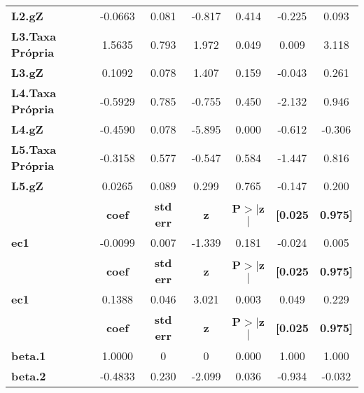 \begin{center}
\begin{tabular}{lcccccc}
\textbf{L2.gZ}           &      -0.0663  &        0.081     &    -0.817  &         0.414        &       -0.225    &        0.093     \\
\textbf{L3.Taxa Própria} &       1.5635  &        0.793     &     1.972  &         0.049        &        0.009    &        3.118     \\
\textbf{L3.gZ}           &       0.1092  &        0.078     &     1.407  &         0.159        &       -0.043    &        0.261     \\
\textbf{L4.Taxa Própria} &      -0.5929  &        0.785     &    -0.755  &         0.450        &       -2.132    &        0.946     \\
\textbf{L4.gZ}           &      -0.4590  &        0.078     &    -5.895  &         0.000        &       -0.612    &       -0.306     \\
\textbf{L5.Taxa Própria} &      -0.3158  &        0.577     &    -0.547  &         0.584        &       -1.447    &        0.816     \\
\textbf{L5.gZ}           &       0.0265  &        0.089     &     0.299  &         0.765        &       -0.147    &        0.200     \\
             & \textbf{coef} & \textbf{std err} & \textbf{z} & \textbf{P$> |$z$|$} & \textbf{[0.025} & \textbf{0.975]}  \\
\midrule
\textbf{ec1} &      -0.0099  &        0.007     &    -1.339  &         0.181        &       -0.024    &        0.005     \\
             & \textbf{coef} & \textbf{std err} & \textbf{z} & \textbf{P$> |$z$|$} & \textbf{[0.025} & \textbf{0.975]}  \\
\midrule
\textbf{ec1} &       0.1388  &        0.046     &     3.021  &         0.003        &        0.049    &        0.229     \\
                & \textbf{coef} & \textbf{std err} & \textbf{z} & \textbf{P$> |$z$|$} & \textbf{[0.025} & \textbf{0.975]}  \\
\midrule
\textbf{beta.1} &       1.0000  &            0     &         0  &         0.000        &        1.000    &        1.000     \\
\textbf{beta.2} &      -0.4833  &        0.230     &    -2.099  &         0.036        &       -0.934    &       -0.032     \\
\bottomrule
\end{tabular}
\end{center}